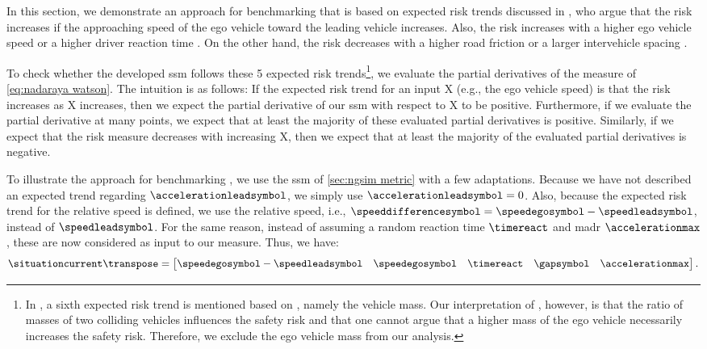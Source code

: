 In this section, we demonstrate an approach for benchmarking  that is based on expected risk trends discussed in \textcite{mullakkal2017comparative}, who argue that the risk increases if the approaching speed of the ego vehicle toward the leading vehicle increases.
Also, the risk increases with a higher ego vehicle speed \autocite{aarts2006driving} or a higher driver reaction time \autocite{klauer2006impact}.
On the other hand, the risk decreases with a higher road friction \autocite{wallman2001friction} or a larger intervehicle spacing \autocite{mullakkal2017comparative}.

To check whether the developed \ac{ssm} follows these 5 expected risk trends\footnote{In \autocite{mullakkal2017comparative}, a sixth expected risk trend is mentioned based on \autocite{evans1994driver}, namely the vehicle mass. 
	Our interpretation of \autocite{evans1994driver}, however, is that the ratio of masses of two colliding vehicles influences the safety risk and that one cannot argue that a higher mass of the ego vehicle necessarily increases the safety risk. 
	Therefore, we exclude the ego vehicle mass from our analysis.}, we evaluate the partial derivatives of the measure of \cref{eq:nadaraya watson}.
The intuition is as follows: If the expected risk trend for an input X (e.g., the ego vehicle speed) is that the risk increases as X increases, then we expect the partial derivative of our \ac{ssm} with respect to X to be positive.
Furthermore, if we evaluate the partial derivative at many points, we expect that at least the majority of these evaluated partial derivatives is positive.
Similarly, if we expect that the risk measure decreases with increasing X, then we expect that at least the majority of the evaluated partial derivatives is negative.

To illustrate the approach for benchmarking , we use the \ac{ssm} of \cref{sec:ngsim metric} with a few adaptations.
Because we have not described an expected trend regarding $\accelerationleadsymbol$, we simply use $\accelerationleadsymbol=0$.
\cstarta Also, because the expected risk trend for the relative speed is defined, we use the relative speed, i.e., $\speeddifferencesymbol=\speedegosymbol-\speedleadsymbol$, instead of $\speedleadsymbol$. 
For the same reason, \cenda instead of assuming a random reaction time $\timereact$ and \ac{madr} $\accelerationmax$, these are now considered as input to our measure. 
Thus, we have:
\begin{equation}
	\label{eq:input partial derivatives}
	\situationcurrent\transpose = \begin{bmatrix}
		\speedegosymbol-\speedleadsymbol & \speedegosymbol & \timereact & \gapsymbol & \accelerationmax
	\end{bmatrix}.
\end{equation}

